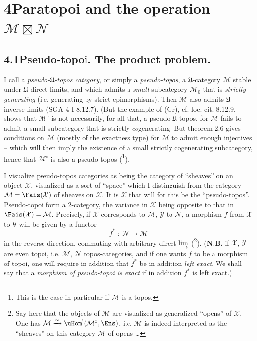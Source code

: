 

\section*{4\quad Paratopoi and the operation $\mathcal{M}\boxtimes\mathcal{N}$}

\subsection*{4.1\quad Pseudo-topoi. The product problem.}

I call a \textit{pseudo-$\mathfrak{U}$-topos category}, or simply a \textit{pseudo-topos}, a $\mathfrak{U}$-category $\mathcal{M}$ stable under $\mathfrak{U}$-direct limits, and which admits a \textit{small} subcategory $\mathcal{M}_0$ that is \textit{strictly generating} (i.e. generating by strict epimorphisms). Then $\mathcal{M}$ also admits $\mathfrak{U}$-inverse limits (SGA 4 I 8.12.7). (But the example of (Gr), cf. loc. cit. 8.12.9, shows that $\mathcal{M}^\circ$ is not necessarily, for all that, a pseudo-$\mathfrak{U}$-topos, for $\mathcal{M}$ fails to admit a small subcategory that is strictly \textit{co}generating. But theorem 2.6 gives conditions on $\mathcal{M}$ (mostly of the exactness type) %
for $\mathcal{M}$ to admit enough injectives -- which will then imply the existence of a small strictly cogenerating subcategory, hence that $\mathcal{M}^\circ$ is also a pseudo-topos (\footnote{This is the case in particular if $\mathcal{M}$ is a topos.}).

I visualize pseudo-topos categories as being the category of ``sheaves'' on an object $\mathcal{X}$, visualized as a sort of ``space'' which I distinguish from the category $\mathcal{M}=\Fais(\mathcal{X})$ of sheaves on $\mathcal{X}$. It is $\mathcal{X}$ that will for this be the ``pseudo-topos''. Pseudo-topoi form a 2-category, the variance in $\mathcal{X}$ being opposite to that in $\Fais(\mathcal{X})=\mathcal{M}$. Precisely, if $\mathcal{X}$ corresponds to $\mathcal{M}$, $\mathcal{Y}$ to $\mathcal{N}$, a morphism $f$ from $\mathcal{X}$ to $\mathcal{Y}$ will be given by a functor
\[
f^* \;:\; \mathcal{N} \longrightarrow \mathcal{M}
\tag*{(4.1.1)}
\]
in the reverse direction, commuting with arbitrary direct $\varinjlim$ (\footnote{Say here that the objects of $\mathcal{M}$ are visualized as generalized ``opens'' of $\mathcal{X}$. One has $\mathcal{M}\xrightarrow{\sim}\uHom^!(\mathcal{M}^\circ,\Ens)$, i.e. $\mathcal{M}$ is indeed interpreted as the ``sheaves'' on this category $\mathcal{M}$ of opens \ldots}). (\textbf{N.B.} if $\mathcal{X}$, $\mathcal{Y}$ are even topoi, i.e. $\mathcal{M}$, $\mathcal{N}$ topos-categories, and if one wants $f$ to be a morphism of topoi, one will require in addition that $f^*$ be in addition \textit{left exact}. We shall say that a \textit{morphism of pseudo-topoi is exact} if in addition $f^*$ is left exact.)

